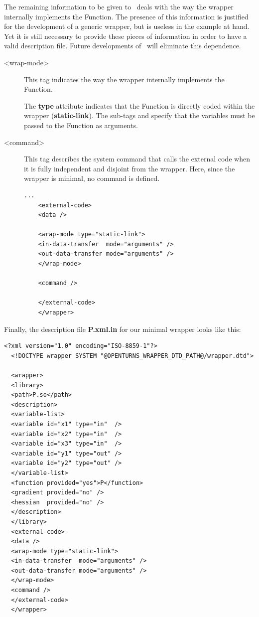 
The remaining information to be given to \OT\ deals with the way the wrapper internally implements the Function. The presence of this information is justified for the development of a generic wrapper, but is useless in the example at hand. Yet it is still necessary to provide these pieces of information in order to have a valid description file. Future developments of \OT\ will eliminate this dependence.

\begin{description}
\item[<wrap-mode>] This tag indicates the way the wrapper internally implements the Function.

  The {\bf type} attribute indicates that the Function is directly coded within the wrapper ({\bf static-link}). The sub-tags {\bf <in-data-transfer>} and {\bf<out-data-transfer>} specify that the variables must be passed to the Function as arguments.

\item[<command>] This tag describes the system command that calls the external code when it is fully independent and disjoint from the wrapper. Here, since the wrapper is minimal, no command is defined.

  \lstset{language=XML, basicstyle=\normalsize}
  \begin{lstlisting}[frame=TBRL]
    ...
    <external-code>
    <data />

    <wrap-mode type="static-link">
    <in-data-transfer  mode="arguments" />
    <out-data-transfer mode="arguments" />
    </wrap-mode>

    <command />

    </external-code>
    </wrapper>
  \end{lstlisting}
\end{description}

Finally, the description file {\bf P.xml.in} for our minimal wrapper looks like this:
\lstset{language=XML, basicstyle=\normalsize}
\begin{lstlisting}[frame=TBRL]
  <?xml version="1.0" encoding="ISO-8859-1"?>
  <!DOCTYPE wrapper SYSTEM "@OPENTURNS_WRAPPER_DTD_PATH@/wrapper.dtd">

  <wrapper>
  <library>
  <path>P.so</path>
  <description>
  <variable-list>
  <variable id="x1" type="in"  />
  <variable id="x2" type="in"  />
  <variable id="x3" type="in"  />
  <variable id="y1" type="out" />
  <variable id="y2" type="out" />
  </variable-list>
  <function provided="yes">P</function>
  <gradient provided="no" />
  <hessian  provided="no" />
  </description>
  </library>
  <external-code>
  <data />
  <wrap-mode type="static-link">
  <in-data-transfer  mode="arguments" />
  <out-data-transfer mode="arguments" />
  </wrap-mode>
  <command />
  </external-code>
  </wrapper>
\end{lstlisting}


